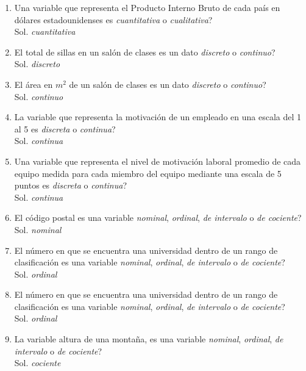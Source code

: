 \documentclass[12pt,letterpaper]{article}
\begin{document}
\begin{enumerate}
   \item Una variable que representa el Producto Interno Bruto de cada país en dólares estadounidenses es \emph{cuantitativa} o \emph{cualitativa}? \\ 
   Sol. \emph{cuantitativa} 
   
   \item El total de sillas en un salón de clases es un dato \emph{discreto} o \emph{continuo}? \\ 
   Sol. \emph{discreto} 
   
   \item El área en $m^{2}$ de un salón de clases es un dato \emph{discreto} o \emph{continuo}? \\ 
   Sol. \emph{continuo} 
   
   \item La variable que representa la motivación de un empleado en una escala del 1 al 5 es \emph{discreta} o \emph{continua}? \\ 
   Sol. \emph{continua}
   
   \item Una variable que representa el nivel de motivación laboral promedio de cada equipo medida para cada miembro del equipo mediante una escala de 5 puntos es \emph{discreta} o \emph{continua}? \\ 
   Sol. \emph{continua}
   
   \item El código postal es una variable \emph{nominal}, \emph{ordinal}, \emph{de intervalo} o \emph{de cociente}? \\ 
   Sol. \emph{nominal}
   
   \item El número en que se encuentra una universidad dentro de un rango de clasificación es una variable \emph{nominal}, \emph{ordinal}, \emph{de intervalo} o \emph{de cociente}? \\ 
   Sol. \emph{ordinal}
   
   \item El número en que se encuentra una universidad dentro de un rango de clasificación es una variable \emph{nominal}, \emph{ordinal}, \emph{de intervalo} o \emph{de cociente}? \\ 
   Sol. \emph{ordinal}
   
   \item La variable \guillemotleft altura de una montaña\guillemotright , es una variable \emph{nominal}, \emph{ordinal}, \emph{de intervalo} o \emph{de cociente}? \\ 
   Sol. \emph{cociente}
   
\end{enumerate}
\end{document}

